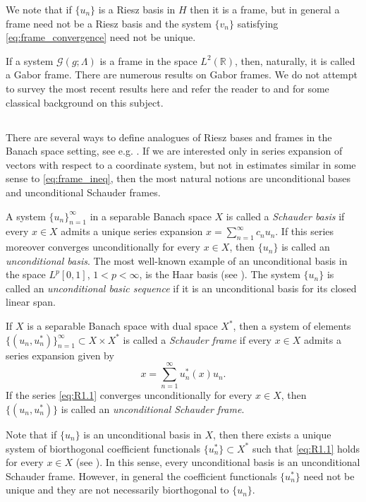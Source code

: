 \documentclass[reqno,a4paper,12pt]{amsart}
\numberwithin{equation}{section}
\numberwithin{figure}{section}
\newcommand\R{\mathbb{R}}
\newcommand\G{\mathcal{G}}
\newcommand\1{\mathds{1}}
\newcommand\sbt{\subset}
\theoremstyle{plain}
\theoremstyle{definition}
\begin{document}
We note that if
$\{u_n\}$  is a Riesz basis in $H$ then it is a frame, but in general
a frame need not be a Riesz basis and the
system $\{v_n\}$ satisfying  \eqref{eq:frame_convergence}
need not be unique.

If a system $\G(g; \Lambda)$ is a frame in the space $L^2(\R)$, then, naturally, it is called a Gabor frame. There are numerous results on Gabor frames. We do not attempt to survey the most recent results here and refer the reader to \cite[Chapter 11]{Hei11} and \cite[Chapters 11--13]{Chr16} for some classical background on this subject.

\subsection{}
There are several ways to define analogues of Riesz bases and frames in the Banach space setting, see e.g. \cite[Chapter 24]{Chr16}. If we are interested only in series expansion of vectors with respect to a coordinate system, but not in estimates similar in some sense to \eqref{eq:frame_ineq}, then the most natural notions are unconditional bases and unconditional Schauder frames.

A system $\{u_n\}_{n=1}^{\infty}$ in a separable Banach space $X$ is called a \emph{Schauder basis} if every $x\in X$ admits a unique series expansion $x = \sum_{n=1}^{\infty} c_nu_n$. If this series moreover converges unconditionally for every $x \in X$, then $\{u_n\}$ is called an \emph{unconditional basis}. The most well-known example of an unconditional basis in the space $L^p[0,1]$, $1 < p < \infty$, is the Haar basis (see \cite[Theorem 6.1.7]{AK16}). The system $\{u_n\}$ is called an \emph{unconditional basic sequence} if it is an unconditional basis for its closed linear span.

If  $X$ is a separable Banach space with dual space $X^*$, then a system of elements
$\{(u_n, u_n^*)\}_{n=1}^{\infty} \sbt X\times X^*$ is called a \emph{Schauder frame} if every $x\in X$ admits a series expansion given by
\begin{equation}
\label{eq:R1.1}
x=\sum_{n=1}^{\infty} u_n^*(x) u_n.
\end{equation}
If the series \eqref{eq:R1.1} 
converges unconditionally for every $x \in X$, then
$\{(u_n, u_n^*)\}$
is called an \emph{unconditional Schauder frame}.


Note that if $\{u_n\}$ is an
unconditional basis in $X$, then there exists a unique system 
of biorthogonal  coefficient functionals
$\{u_n^*\} \sbt X^*$
such that \eqref{eq:R1.1} holds for every $x \in X$
(see \cite[Section 1.1]{AK16}). In this sense, every 
unconditional basis is an unconditional Schauder frame.
However, in general the coefficient functionals
$\{u_n^*\}$ need not be unique
and they are not necessarily biorthogonal to $\{u_n\}$. 
\end{document}
